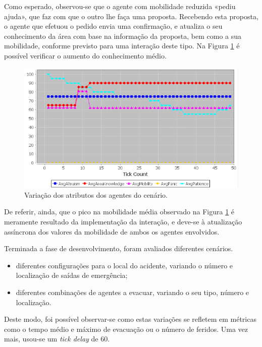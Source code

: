 \documentclass[12pt]{article}
\begin{document}
\begin{titlepage}
\begin{itemize}
Como esperado, observou-se que o agente com mobilidade reduzida «pediu ajuda», que faz com que o outro lhe faça uma proposta. Recebendo esta proposta, o agente que efetuou o pedido envia uma confirmação, e atualiza o seu conhecimento da área com base na informação da proposta, bem como a sua mobilidade, conforme previsto para uma interação deste tipo. Na Figura \ref{help_graph} é possível verificar o aumento do conhecimento médio.

\begin{figure}[H]
	\centering
	\includegraphics{help_test.png}
	\caption{Variação dos atributos dos agentes do cenário.}
	\label{help_graph}
\end{figure}
	
	De referir, ainda, que o pico na mobilidade média observado na Figura \ref{help_graph} é meramente resultado da implementação da interação, e deve-se à atualização assíncrona dos valores da mobilidade de ambos os agentes envolvidos.
	
\end{itemize}


Terminada a fase de desenvolvimento, foram avaliados diferentes cenários.
\begin{itemize}
	\item diferentes configurações para o local do acidente, variando o número e localização de saídas de emergência;
	\item diferentes combinações de agentes a evacuar, variando o seu tipo, número e localização.
\end{itemize}

Deste modo, foi possível observar-se como estas variações se refletem em métricas como o tempo médio e máximo de evacuação ou o número de feridos. Uma vez mais, usou-se um \textit{tick delay} de 60.


\end{titlepage}
\end{document}
